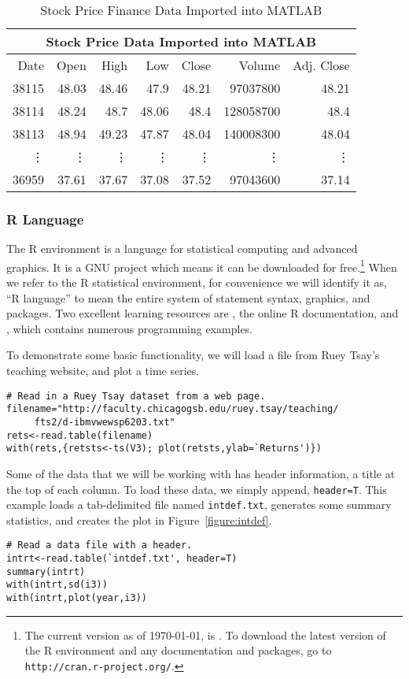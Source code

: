 \begin{table}[htbp]
	\centering
	\begin{tabular}{rrrrrrr}
	\toprule
	\multicolumn{7}{c}{Stock Price Data Imported into MATLAB} \\
	\hline
	Date	& Open & High	& Low & Close	& Volume	& Adj. Close \\
	\hline
	38115 &	48.03 &	48.46 & 47.9 &	48.21 &	97037800	 & 48.21\\
	38114 &	48.24 &	48.7	&  48.06 & 48.4	 & 128058700	& 48.4\\
	38113 &	48.94 &	49.23 & 47.87 & 48.04 &	140008300 &	48.04 \\
	\vdots & \vdots & \vdots & \vdots & \vdots & \vdots & \vdots \\
	36959 &	37.61 &	37.67 &	37.08 &	37.52 &	97043600 &	37.14 \\
	\bottomrule
	\end{tabular}
	\caption{Stock Price Finance Data Imported into MATLAB}
	\label{tab:matlab-xl}
\end{table}

\subsubsection{R Language}
The R environment is a language for statistical computing and advanced graphics. It is a GNU project which means it can be downloaded for free.\footnote{The current version as of \today{}, is \Rversion. To download the latest version of the R environment and any documentation and packages, go to \texttt{http://cran.r-project.org/}.} When we refer to the R statistical environment, for convenience we will identify it as, ``R language'' to mean the entire system of statement syntax, graphics, and packages. Two excellent learning resources are , the online R documentation, and , which contains numerous programming examples.

To demonstrate some basic functionality, we will load a file from Ruey Tsay's teaching website, and plot a time series.
\begin{verbatim}
# Read in a Ruey Tsay dataset from a web page.
filename="http://faculty.chicagogsb.edu/ruey.tsay/teaching/
     fts2/d-ibmvwewsp6203.txt"
rets<-read.table(filename) 
with(rets,{retsts<-ts(V3); plot(retsts,ylab=`Returns')})
\end{verbatim}

Some of the data that we will be working with has header information, a title at the top of each column. To load these data, we simply append, \texttt{header=T}. This example loads a tab-delimited file named \texttt{intdef.txt}, generates some summary statistics, and creates the plot in Figure~\ref{figure:intdef}.
\begin{verbatim}
# Read a data file with a header.
intrt<-read.table(`intdef.txt', header=T)
summary(intrt)
with(intrt,sd(i3))
with(intrt,plot(year,i3))
\end{verbatim}

